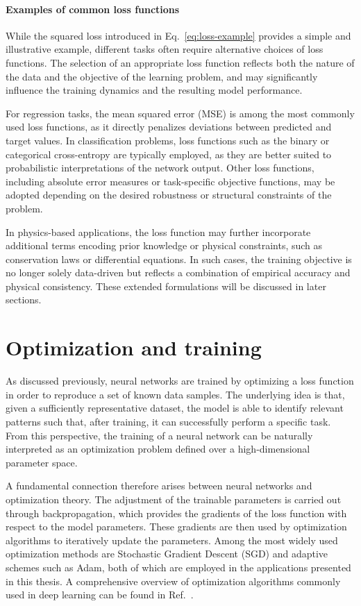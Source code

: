 \paragraph{Examples of common loss functions}
While the squared loss introduced in Eq.~\eqref{eq:loss-example} provides a simple and illustrative example, different tasks often require alternative choices of loss functions. The selection of an appropriate loss function reflects both the nature of the data and the objective of the learning problem, and may significantly influence the training dynamics and the resulting model performance.

For regression tasks, the mean squared error (MSE) is among the most commonly used loss functions, as it directly penalizes deviations between predicted and target values. In classification problems, loss functions such as the binary or categorical cross-entropy are typically employed, as they are better suited to probabilistic interpretations of the network output. Other loss functions, including absolute error measures or task-specific objective functions, may be adopted depending on the desired robustness or structural constraints of the problem.

In physics-based applications, the loss function may further incorporate additional terms encoding prior knowledge or physical constraints, such as conservation laws or differential equations. In such cases, the training objective is no longer solely data-driven but reflects a combination of empirical accuracy and physical consistency. These extended formulations will be discussed in later sections.

\section{Optimization and training}
\label{sec:optimization}

As discussed previously, neural networks are trained by optimizing a loss function in order to reproduce a set of known data samples. The underlying idea is that, given a sufficiently representative dataset, the model is able to identify relevant patterns such that, after training, it can successfully perform a specific task. From this perspective, the training of a neural network can be naturally interpreted as an optimization problem defined over a high-dimensional parameter space.

A fundamental connection therefore arises between neural networks and optimization theory. The adjustment of the trainable parameters is carried out through backpropagation, which provides the gradients of the loss function with respect to the model parameters. These gradients are then used by optimization algorithms to iteratively update the parameters. Among the most widely used optimization methods are Stochastic Gradient Descent (SGD) and adaptive schemes such as Adam, both of which are employed in the applications presented in this thesis. A comprehensive overview of optimization algorithms commonly used in deep learning can be found in Ref.~\cite{Ruder2016}.

